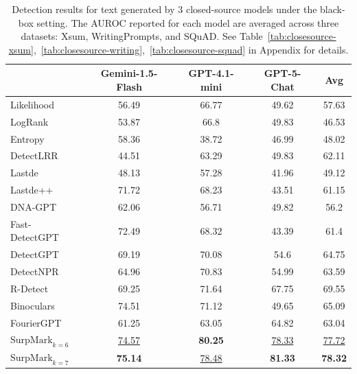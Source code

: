 \documentclass{article}
\theoremstyle{plain}
\theoremstyle{definition}
\theoremstyle{remark}
\begin{document}
\begin{table}
{\scriptsize
\centering
\begin{tabular}{lcccc}
\toprule
& Gemini-1.5-Flash & GPT-4.1-mini & GPT-5-Chat & Avg  \\
\midrule
Likelihood & 56.49 & 66.77 & 49.62 &  57.63 \\

LogRank & 53.87 & 66.8 & 49.83 & 46.53 \\

Entropy & 58.36 & 38.72 & 46.99 & 48.02 \\

DetectLRR & 44.51 & 63.29 & 49.83 & 62.11  \\

Lastde & 48.13 & 57.28& 41.96 & 49.12 \\

Lastde++ & 71.72 & 68.23 & 43.51 & 61.15 \\

DNA-GPT &62.06 & 56.71 & 49.82&  56.2\\

Fast-DetectGPT & 72.49 & 68.32 & 43.39 &  61.4\\

DetectGPT &69.19 & 70.08 & 54.6 & 64.75\\

DetectNPR & 64.96 & 70.83 & 54.99 & 63.59 \\

R-Detect &69.25 & 71.64 & 67.75 & 69.55 \\

Binoculars &74.51 & 71.12 & 49.65 & 65.09 \\

FourierGPT &61.25 & 63.05 & 64.82 &  63.04\\

\rowcolor{ours}$\text{SurpMark}_{k=6}$ & \underline{74.57} & \textbf{80.25} & \underline{78.33} & \underline{77.72} \\

\rowcolor{ours}$\text{SurpMark}_{k=7}$ & \textbf{75.14} & \underline{78.48} & \textbf{81.33} & \textbf{78.32}\\
\bottomrule
\end{tabular}}
\caption{Detection results for text generated by 3 closed-source models under the black-box setting. The AUROC reported for each model are averaged across three datasets: Xsum, WritingPrompts, and SQuAD. See Table~\ref{tab:closesource-xsum},~\ref{tab:closesource-writing},~\ref{tab:closesource-squad} in Appendix for details.}
\label{tab:closesource}
\end{table}
\end{document}
